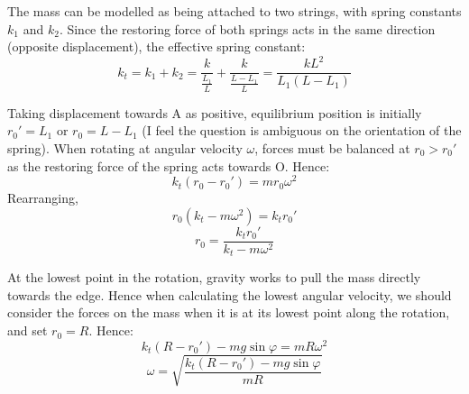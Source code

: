\begin{solution}
    \begin{subsolution}
        The mass can be modelled as being attached to two strings, with spring constants $k_1$ and $k_2$. Since the restoring force of both springs acts in the same direction (opposite displacement), the effective spring constant:
        \[k_t = k_1 + k_2 = \frac{k}{\frac{L_1}{L}} + \frac{k}{\frac{L-L_1}{L}} = \boxed{\frac{kL^2}{L_1(L-L_1)}}\]
    \end{subsolution}
    \begin{subsolution}
        Taking displacement towards A as positive, equilibrium position is initially $r_0' = L_1$ or $r_0 = L-L_1$ (I feel the question is ambiguous on the orientation of the spring). 
        When rotating at angular velocity $\omega$, forces must be balanced at $r_0 > r_0'$ as the restoring force of the spring acts towards O. Hence:
        \[k_t(r_0-r_0') = mr_0\omega^2\]
        Rearranging,
        \[r_0(k_t-m\omega^2) = k_tr_0'\]
        \[\boxed{r_0 = \frac{k_tr_0'}{k_t-m\omega^2}}\]
    \end{subsolution}
    \begin{subsolution}
        At the lowest point in the rotation, gravity works to pull the mass directly towards the edge. Hence when calculating the lowest angular velocity, we should consider the forces on the mass when it is at its lowest point along the rotation, and set $r_0 = R$. Hence:
        \[k_t(R-r_0')-mg\sin\varphi = mR\omega^2\]
        \[\boxed{\omega = \sqrt{\frac{k_t(R-r_0')-mg\sin\varphi}{mR}}}\]
    \end{subsolution}
\end{solution}
\newpage


